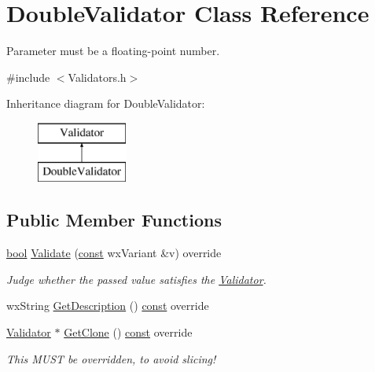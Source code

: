 \hypertarget{class_double_validator}{}\section{Double\+Validator Class Reference}
\label{class_double_validator}


Parameter must be a floating-\/point number.  




{\ttfamily \#include $<$Validators.\+h$>$}

Inheritance diagram for Double\+Validator\+:\begin{figure}[H]
\begin{center}
\leavevmode
\includegraphics[height=2.000000cm]{class_double_validator}
\end{center}
\end{figure}
\subsection*{Public Member Functions}
\begin{DoxyCompactItemize}
\item 
\hyperlink{mac_2config_2i386_2lib-src_2libsoxr_2soxr-config_8h_abb452686968e48b67397da5f97445f5b}{bool} \hyperlink{class_double_validator_a41b7e1a6e57b7cb07ed4d12b0814ccb3}{Validate} (\hyperlink{getopt1_8c_a2c212835823e3c54a8ab6d95c652660e}{const} wx\+Variant \&v) override
\begin{DoxyCompactList}\small\item\em Judge whether the passed value satisfies the \hyperlink{class_validator}{Validator}. \end{DoxyCompactList}\item 
wx\+String \hyperlink{class_double_validator_a5863262efbb4cb6957e5ff1bf0404b45}{Get\+Description} () \hyperlink{getopt1_8c_a2c212835823e3c54a8ab6d95c652660e}{const}  override
\item 
\hyperlink{class_validator}{Validator} $\ast$ \hyperlink{class_double_validator_ad433def4664b2bb03a07ff294db17c4d}{Get\+Clone} () \hyperlink{getopt1_8c_a2c212835823e3c54a8ab6d95c652660e}{const}  override
\begin{DoxyCompactList}\small\item\em This M\+U\+ST be overridden, to avoid slicing! \end{DoxyCompactList}\end{DoxyCompactItemize}


